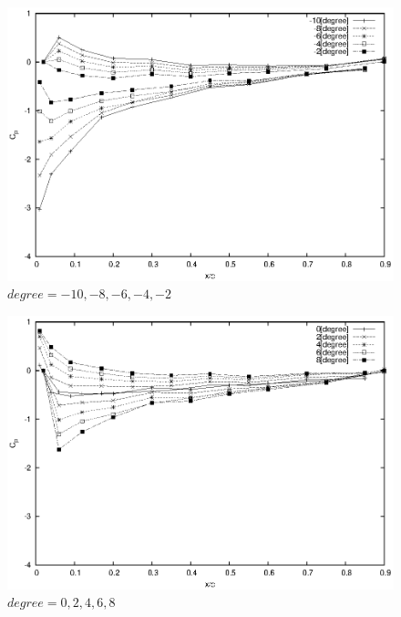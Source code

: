 \documentclass[a4j,twoside,openright,11pt]{jarticle}
\begin{document}
\begin{figure}[htbp]
\begin{center}
\includegraphics[width=12cm]{./2-CP/-10to-2.eps}
\end{center}
\caption{$degree = -10,-8,-6,-4,-2$}
\end{figure}

\begin{figure}[htbp]
\begin{center}
\includegraphics[width=12cm]{./2-CP/0to8.eps}
\end{center}
\caption{$degree = 0,2,4,6,8$}
\end{figure}
\end{document}
